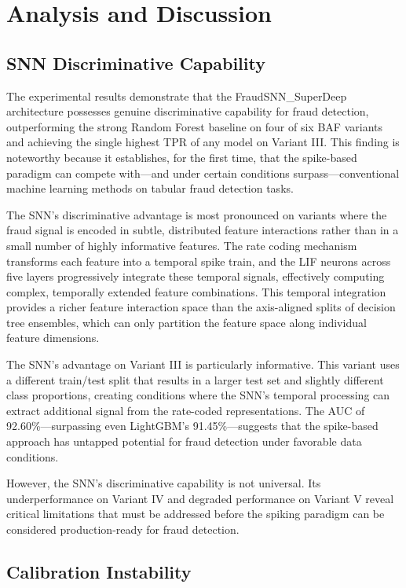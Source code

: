 \section{Analysis and Discussion}

\subsection{SNN Discriminative Capability}

The experimental results demonstrate that the FraudSNN\_SuperDeep architecture possesses genuine discriminative capability for fraud detection, outperforming the strong Random Forest baseline on four of six BAF variants and achieving the single highest TPR of any model on Variant III. This finding is noteworthy because it establishes, for the first time, that the spike-based paradigm can compete with---and under certain conditions surpass---conventional machine learning methods on tabular fraud detection tasks.

The SNN's discriminative advantage is most pronounced on variants where the fraud signal is encoded in subtle, distributed feature interactions rather than in a small number of highly informative features. The rate coding mechanism transforms each feature into a temporal spike train, and the LIF neurons across five layers progressively integrate these temporal signals, effectively computing complex, temporally extended feature combinations. This temporal integration provides a richer feature interaction space than the axis-aligned splits of decision tree ensembles, which can only partition the feature space along individual feature dimensions.

The SNN's advantage on Variant III is particularly informative. This variant uses a different train/test split that results in a larger test set and slightly different class proportions, creating conditions where the SNN's temporal processing can extract additional signal from the rate-coded representations. The AUC of 92.60\%---surpassing even LightGBM's 91.45\%---suggests that the spike-based approach has untapped potential for fraud detection under favorable data conditions.

However, the SNN's discriminative capability is not universal. Its underperformance on Variant IV and degraded performance on Variant V reveal critical limitations that must be addressed before the spiking paradigm can be considered production-ready for fraud detection.

\subsection{Calibration Instability}
\label{sec:snn-calibration}

